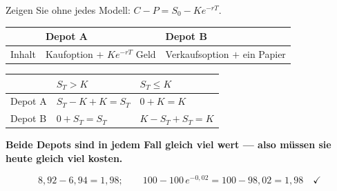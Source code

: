 \begin{aufgabe}
Zeigen Sie ohne jedes Modell: $C - P = S_0 - Ke^{-rT}$.

\loesung
{}
\begin{center}
{\small
\renewcommand{\arraystretch}{1.5}
\begin{tabular}{@{}P{2.4cm}P{2.8cm}P{2.8cm}@{}}
\toprule
& \textbf{Depot A} & \textbf{Depot B}\\
\midrule
Inhalt & Kaufoption $+$ $Ke^{-rT}$ Geld & Verkaufsoption $+$ ein Papier\\
\bottomrule
\end{tabular}}
\end{center}

\begin{center}
{\small
\renewcommand{\arraystretch}{1.48}
\begin{tabular}{@{}P{2.4cm}P{2.6cm}P{2.6cm}@{}}
\toprule
& $S_T > K$ & $S_T \le K$\\
\midrule
Depot A & $S_T - K + K = S_T$ & $0 + K = K$\\
Depot B & $0 + S_T = S_T$ & $K - S_T + S_T = K$\\
\bottomrule
\end{tabular}}
\end{center}

\begin{center}
\begin{minipage}{0.9\textwidth}
\textbf{Beide Depots sind in jedem Fall gleich viel wert --- also müssen sie heute gleich viel kosten.}
\end{minipage}
\end{center}

\[ 8{,}92 - 6{,}94 = 1{,}98; \qquad 100 - 100\,e^{-0{,}02} = 100-98{,}02 = 1{,}98 \quad \checkmark \]

\begin{center}
\begin{minipage}{0.88\textwidth}
\end{minipage}
\end{center}
\end{aufgabe}

